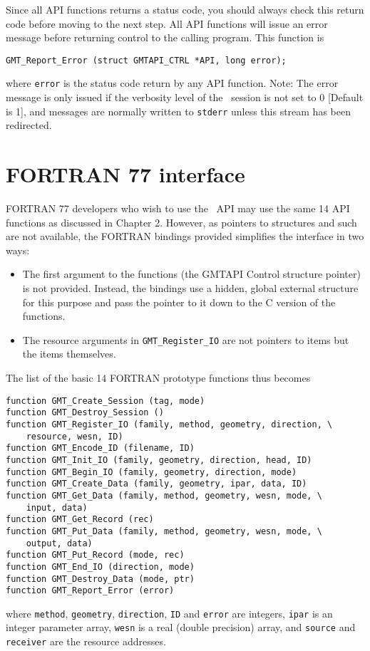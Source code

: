 \documentclass{report}
\begin{document}
Since all API functions returns a status code, you should always check this return code before
moving to the next step.  All API functions will issue an error message before returning control
to the calling program.  This function is

\begin{verbatim}
GMT_Report_Error (struct GMTAPI_CTRL *API, long error);
\end{verbatim}
where \texttt{error} is the status code return by any API function.  Note: The error message is
only issued if the verbosity level of the \GMT\ session is not set to 0 [Default is 1], and
messages are normally written to \texttt{stderr} unless this stream has been redirected.

\section{FORTRAN 77 interface} 

FORTRAN 77 developers who wish to use the \GMT\ API may use the same 14 API functions as discussed in Chapter 2.
However, as pointers to structures and such are not available, the FORTRAN bindings provided simplifies the
interface in two ways:
\begin{itemize}
\item The first argument to the functions (the GMTAPI Control structure pointer) is not provided.  Instead,
the bindings use a hidden, global external structure for this purpose and pass the pointer to it down to
the C version of the functions.
\item The resource arguments in \texttt{GMT\_Register\_IO} are not pointers to
items but the items themselves.
\end{itemize}
The list of the basic 14 FORTRAN prototype functions thus becomes
\begin{verbatim}
function GMT_Create_Session (tag, mode)
function GMT_Destroy_Session ()
function GMT_Register_IO (family, method, geometry, direction, \
    resource, wesn, ID)
function GMT_Encode_ID (filename, ID)
function GMT_Init_IO (family, geometry, direction, head, ID)
function GMT_Begin_IO (family, geometry, direction, mode)
function GMT_Create_Data (family, geometry, ipar, data, ID)
function GMT_Get_Data (family, method, geometry, wesn, mode, \
	input, data)
function GMT_Get_Record (rec)
function GMT_Put_Data (family, method, geometry, wesn, mode, \
	output, data)
function GMT_Put_Record (mode, rec)
function GMT_End_IO (direction, mode)
function GMT_Destroy_Data (mode, ptr)
function GMT_Report_Error (error)
\end{verbatim}
where \texttt{method}, \texttt{geometry}, \texttt{direction}, \texttt{ID} and \texttt{error} are integers,
\texttt{ipar} is an integer parameter array, \texttt{wesn} is a real (double precision) array,
and \texttt{source} and \texttt{receiver} are the resource addresses.

\clearpage
\thispagestyle{headings}
\printindex
\thispagestyle{headings}
\end{document}
